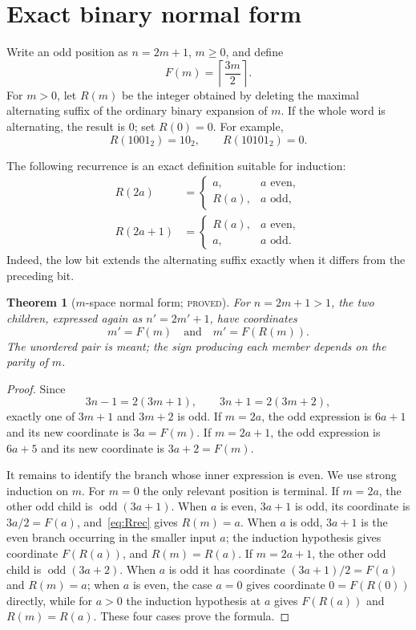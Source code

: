 \documentclass[11pt]{article}
\newtheorem{theorem}{Theorem}[section]
\theoremstyle{definition}
\newcommand{\odd}{\operatorname{odd}}
\newcommand{\proved}{\textsc{proved}}
\begin{document}
\section{Exact binary normal form}

Write an odd position as $n=2m+1$, $m\ge0$, and define
\[
  F(m)=\left\lceil\frac{3m}{2}\right\rceil.
\]
For $m>0$, let $R(m)$ be the integer obtained by deleting the maximal
alternating suffix of the ordinary binary expansion of $m$.  If the whole
word is alternating, the result is $0$; set $R(0)=0$.  For example,
\[
  R(1001_2)=10_2,\qquad R(10101_2)=0.
\]

The following recurrence is an exact definition suitable for induction:
\begin{equation}\label{eq:Rrec}
\begin{aligned}
R(2a)&=\begin{cases}a,&a\text{ even},\\R(a),&a\text{ odd},\end{cases}\\
R(2a+1)&=\begin{cases}R(a),&a\text{ even},\\a,&a\text{ odd}.
\end{cases}
\end{aligned}
\end{equation}
Indeed, the low bit extends the alternating suffix exactly when it differs
from the preceding bit.

\begin{theorem}[$m$-space normal form; \proved]\label{thm:mnormal}
For $n=2m+1>1$, the two children, expressed again as
$n'=2m'+1$, have coordinates
\[
  \boxed{m'=F(m)\quad\text{and}\quad m'=F(R(m)).}
\]
The unordered pair is meant; the sign producing each member depends on the
parity of $m$.
\end{theorem}

\begin{proof}
Since
\[
  3n-1=2(3m+1),\qquad 3n+1=2(3m+2),
\]
exactly one of $3m+1$ and $3m+2$ is odd.  If $m=2a$, the odd expression is
$6a+1$ and its new coordinate is $3a=F(m)$.  If $m=2a+1$, the odd expression
is $6a+5$ and its new coordinate is $3a+2=F(m)$.

It remains to identify the branch whose inner expression is even.  We use
strong induction on $m$.  For $m=0$ the only relevant position is terminal.
If $m=2a$, the other odd child is $\odd(3a+1)$.  When $a$ is even, $3a+1$ is
odd, its coordinate is $3a/2=F(a)$, and~\eqref{eq:Rrec} gives $R(m)=a$.
When $a$ is odd, $3a+1$ is the even branch occurring in the smaller input
$a$; the induction hypothesis gives coordinate $F(R(a))$, and
$R(m)=R(a)$.  If $m=2a+1$, the other odd child is $\odd(3a+2)$.  When $a$ is
odd it has coordinate $(3a+1)/2=F(a)$ and $R(m)=a$; when $a$ is even, the
case $a=0$ gives coordinate $0=F(R(0))$ directly, while for $a>0$ the
induction hypothesis at $a$ gives $F(R(a))$ and $R(m)=R(a)$.  These four cases
prove the formula.
\end{proof}
\end{document}
